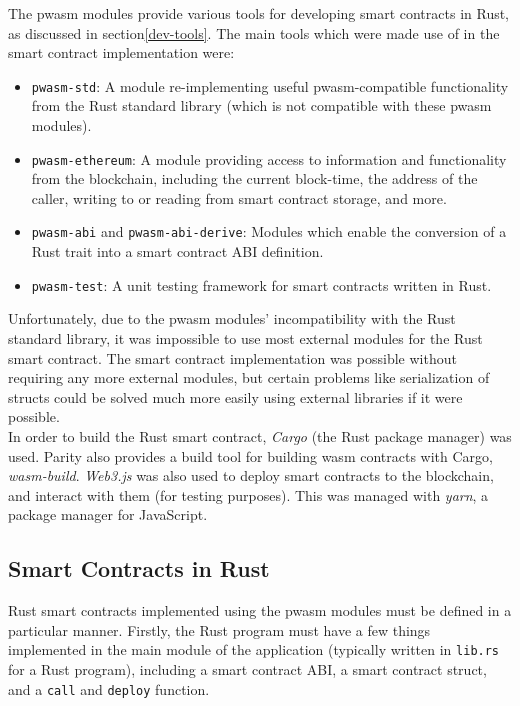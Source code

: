 The pwasm modules provide various tools for developing smart contracts in Rust, as discussed in section\ref{dev-tools}. The main tools which were made use of in the smart contract implementation were: \\

\begin{itemize}
    \item \texttt{pwasm-std}: A module re-implementing useful pwasm-compatible functionality from the Rust standard library (which is not compatible with these pwasm modules).
    \item \texttt{pwasm-ethereum}: A module providing access to information and functionality from the blockchain, including the current block-time, the address of the caller, writing to or reading from smart contract storage, and more.
    \item \texttt{pwasm-abi} and \texttt{pwasm-abi-derive}: Modules which enable the conversion of a Rust trait into a smart contract ABI definition.
    \item \texttt{pwasm-test}: A unit testing framework for smart contracts written in Rust. \\
\end{itemize}

Unfortunately, due to the pwasm modules' incompatibility with the Rust standard library, it was impossible to use most external modules for the Rust smart contract. The smart contract implementation was possible without requiring any more external modules, but certain problems like serialization of structs could be solved much more easily using external libraries if it were possible. \\

In order to build the Rust smart contract, \textit{Cargo}\cite{cargo} (the Rust package manager) was used. Parity also provides a build tool for building wasm contracts with Cargo, \textit{wasm-build}\cite{pwasm-build-tools}. \textit{Web3.js}\cite{web3-intro} was also used to deploy smart contracts to the blockchain, and interact with them (for testing purposes). This was managed with \textit{yarn}\cite{yarn}, a package manager for JavaScript.


\subsection{Smart Contracts in Rust}

Rust smart contracts implemented using the pwasm modules must be defined in a particular manner. Firstly, the Rust program must have a few things implemented in the main module of the application (typically written in \texttt{lib.rs} for a Rust program), including a smart contract ABI, a smart contract struct, and a \texttt{call} and \texttt{deploy} function. \\


